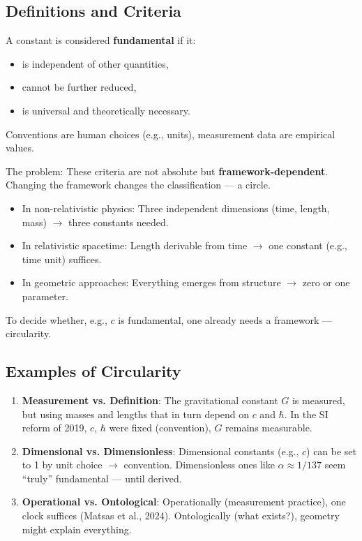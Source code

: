 	\subsection{Definitions and Criteria}
	A constant is considered \textbf{fundamental} if it:
	\begin{itemize}
		\item is independent of other quantities,
		\item cannot be further reduced,
		\item is universal and theoretically necessary.
	\end{itemize}
	Conventions are human choices (e.g., units), measurement data are empirical values.
	
	The problem: These criteria are not absolute but \textbf{framework-dependent}. Changing the framework changes the classification --- a circle.
	\begin{itemize}
		\item In non-relativistic physics: Three independent dimensions (time, length, mass) $\to$ three constants needed.
		\item In relativistic spacetime: Length derivable from time $\to$ one constant (e.g., time unit) suffices.
		\item In geometric approaches: Everything emerges from structure $\to$ zero or one parameter.
	\end{itemize}
	
	To decide whether, e.g., $c$ is fundamental, one already needs a framework --- circularity.
	
	\subsection{Examples of Circularity}
	\begin{enumerate}
		\item \textbf{Measurement vs. Definition}: The gravitational constant $G$ is measured, but using masses and lengths that in turn depend on $c$ and $\hbar$. In the SI reform of 2019, $c$, $\hbar$ were fixed (convention), $G$ remains measurable.
		\item \textbf{Dimensional vs. Dimensionless}: Dimensional constants (e.g., $c$) can be set to 1 by unit choice $\to$ convention. Dimensionless ones like $\alpha \approx 1/137$ seem ``truly'' fundamental --- until derived.
		\item \textbf{Operational vs. Ontological}: Operationally (measurement practice), one clock suffices (Matsas et al., 2024). Ontologically (what exists?), geometry might explain everything.
	\end{enumerate}
	

